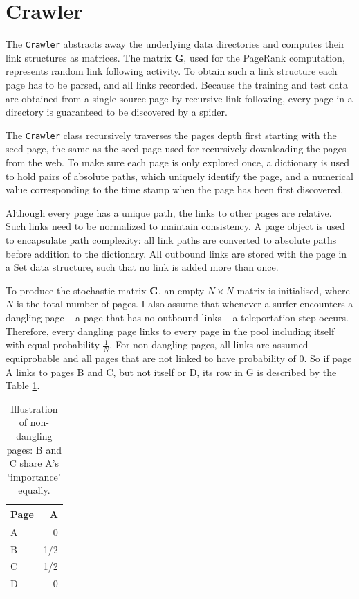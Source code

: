 \documentclass[12pt,notitlepage,twoside]{scrbook}
\begin{document}
\section{Crawler} 

The \texttt{Crawler} abstracts away the underlying data directories and
computes their link structures as matrices.  The matrix \(\bm{G}\), used for the
PageRank computation, represents random link following activity.  To obtain
such a link structure each page has to be parsed, and all links recorded.
Because the training and test data are obtained from a single source page by recursive link
following, every page in a directory is guaranteed to be discovered by a
spider.

The \texttt{Crawler} class recursively traverses the pages depth first starting with the
seed page, the same as the seed page used for recursively downloading the pages
from the web. To make sure each page is only explored once, a dictionary is
used to hold pairs of absolute paths, which uniquely identify the page, and a
numerical value corresponding to the time stamp when the page has been first
discovered.

Although every page has a unique path, the links to other pages are relative.
Such links need to be normalized to maintain consistency.  A page object is
used to encapsulate path complexity: all link paths are converted to absolute
paths before addition to the dictionary.  All outbound links are stored with
the page in a Set data structure, such that no link is added more than once. 

To produce the stochastic matrix \(\bm{G}\), an empty \(N\times N\) matrix is initialised, where \(N\)
is the total number of pages. I also assume that whenever a surfer encounters a
dangling page -- a page that has no outbound links -- a teleportation step
occurs. Therefore, every dangling page links to every page in the pool
including itself with equal probability \(\frac{1}{N}\). For non-dangling pages, all links
are assumed equiprobable and all pages that are not linked to have probability
of 0. So if page A links to pages B and C, but not itself or D, its row in G is
described by the Table \ref{tab}.

\begin{table}
    \begin{center}
      \begin{tabular}{|l|r|}
        \hline
        Page & A \\ \hline
         A &  0  \\ \hline
         B & 1/2 \\ \hline
         C & 1/2 \\ \hline
         D & 0   \\ \hline
      \end{tabular}
      \caption{Illustration of non-dangling pages: B and C share A's `importance' equally.\label{tab}}
  \end{center}
\end{table}
\end{document}
